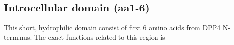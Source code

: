 \subsection{Introcellular domain (aa1-6)}


This short, hydrophilic domain consist of first 6 amino acids from DPP4 N-terminus. The exact functions related to this region is 
